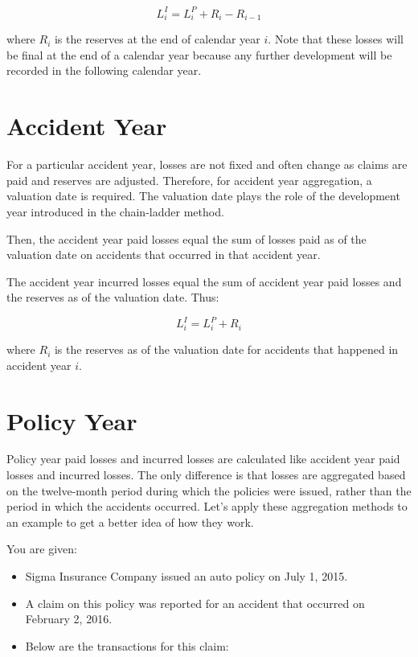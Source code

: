\documentclass[10pt]{article}
\begin{document}
$$
L_{i}^{I}=L_{i}^{P}+R_{i}-R_{i-1}
$$

where $R_{i}$ is the reserves at the end of calendar year $i$. Note that these losses will be final at the end of a calendar year because any further development will be recorded in the following calendar year.

\section{Accident Year}
For a particular accident year, losses are not fixed and often change as claims are paid and reserves are adjusted. Therefore, for accident year aggregation, a valuation date is required. The valuation date plays the role of the development year introduced in the chain-ladder method.

Then, the accident year paid losses equal the sum of losses paid as of the valuation date on accidents that occurred in that accident year.

The accident year incurred losses equal the sum of accident year paid losses and the reserves as of the valuation date. Thus:

$$
L_{i}^{I}=L_{i}^{P}+R_{i}
$$

where $R_{i}$ is the reserves as of the valuation date for accidents that happened in accident year $i$.

\section{Policy Year}
Policy year paid losses and incurred losses are calculated like accident year paid losses and incurred losses. The only difference is that losses are aggregated based on the twelve-month period during which the policies were issued, rather than the period in which the accidents occurred. Let's apply these aggregation methods to an example to get a better idea of how they work.

You are given:

\begin{itemize}
  \item Sigma Insurance Company issued an auto policy on July 1, 2015.

  \item A claim on this policy was reported for an accident that occurred on February 2, 2016.

  \item Below are the transactions for this claim:

\end{itemize}
\end{document}

